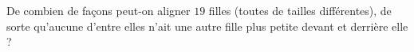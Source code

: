 \documentclass[varwidth]{standalone}
\begin{document}
    De combien de fa\c cons peut-on aligner $19$ filles (toutes de tailles diff\'erentes), de sorte qu'aucune d'entre elles n'ait une autre fille plus petite devant et derri\`ere elle ?
\end{document}

